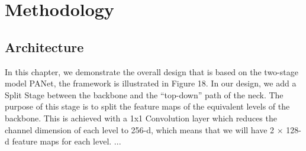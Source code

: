 \chapter{Methodology}
\section{Architecture}
In this chapter, we demonstrate the overall design that is based on the two-stage model PANet, the framework is illustrated in Figure 18. In our design, we add a Split Stage between the backbone and the “top-down” path of the neck. The purpose of this stage is to split the feature maps of the equivalent levels of the backbone. This is achieved with a 1x1 Convolution layer which reduces the channel dimension of each level to 256-d, which means that we will have 2 × 128-d feature maps for each level. ...
